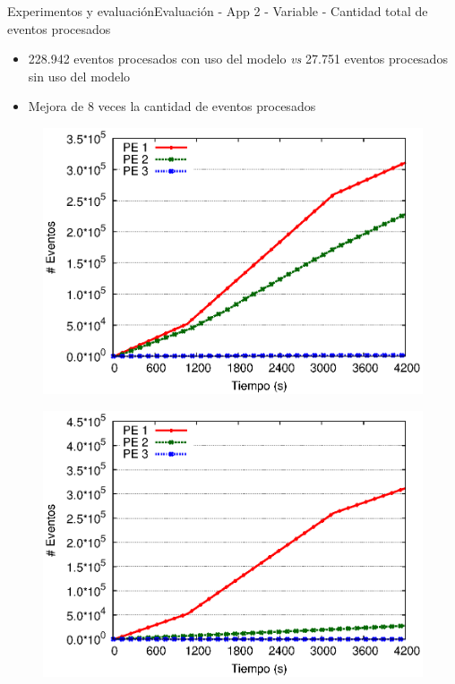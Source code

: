 \begin{frame}{Experimentos y evaluación}{Evaluación - App 2 - Variable - Cantidad total de eventos procesados}

\begin{itemize}
\item 228.942 eventos procesados con uso del modelo \textit{vs} 27.751 eventos procesados sin uso del modelo
\item Mejora de 8 veces la cantidad de eventos procesados
\end{itemize}

\begin{multicols}{2}
\begin{figure}[p]
	\centering
	\includegraphics[scale=0.475]{images/exp/app2/normal/cm/eventCount.eps}
\end{figure}

\begin{figure}[p]
	\centering
	\includegraphics[scale=0.475]{images/exp/app2/normal/sm/eventCount.eps}
\end{figure}
\end{multicols}
\end{frame}

